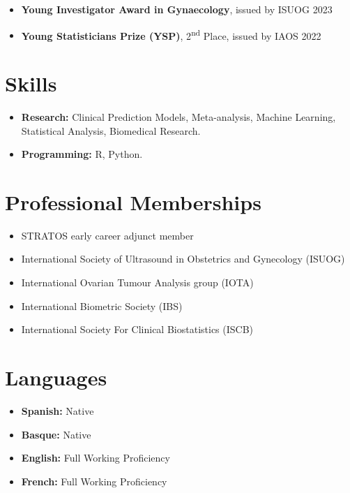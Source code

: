 \begin{itemize}
    \item \textbf{Young Investigator Award in Gynaecology}, issued by ISUOG \hfill 2023
    \item \textbf{Young Statisticians Prize (YSP)}, 2\textsuperscript{nd} Place, issued by IAOS \hfill 2022
\end{itemize}

\section*{Skills}

\begin{itemize}
    \item \textbf{Research:} Clinical Prediction Models, Meta-analysis, Machine Learning, Statistical Analysis, Biomedical Research.
    \item \textbf{Programming:} R, Python.
\end{itemize}

\section*{Professional Memberships}

\begin{itemize}
    \item STRATOS early career adjunct member
    \item International Society of Ultrasound in Obstetrics and Gynecology (ISUOG)
    \item International Ovarian Tumour Analysis group (IOTA)
    \item International Biometric Society (IBS)
    \item International Society For Clinical Biostatistics (ISCB)
\end{itemize}

\section*{Languages}

\begin{itemize}
    \item \textbf{Spanish:} Native
    \item \textbf{Basque:} Native
    \item \textbf{English:} Full Working Proficiency
    \item \textbf{French:} Full Working Proficiency
\end{itemize}